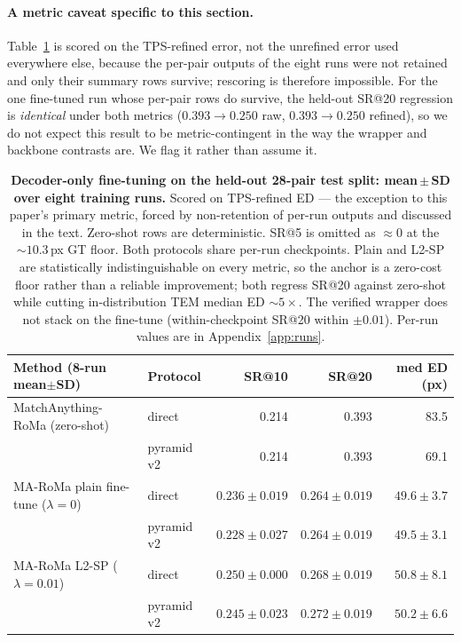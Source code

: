 \documentclass[10pt]{article}
\begin{document}
\paragraph{A metric caveat specific to this section.} Table~\ref{tab:finetune} is scored on the TPS-refined error, not the unrefined error used everywhere else, because the per-pair outputs of the eight runs were not retained and only their summary rows survive; rescoring is therefore impossible. For the one fine-tuned run whose per-pair rows do survive, the held-out SR@20 regression is \emph{identical} under both metrics ($0.393\rightarrow0.250$ raw, $0.393\rightarrow0.250$ refined), so we do not expect this result to be metric-contingent in the way the wrapper and backbone contrasts are. We flag it rather than assume it.

\begin{table}[t]
\centering
\small
\begin{tabular}{llrrr}
\toprule
Method (8-run mean$\pm$SD) & Protocol & SR@10 & SR@20 & med ED (px) \\
\midrule
MatchAnything-RoMa (zero-shot)          & direct     & 0.214 & 0.393 & 83.5 \\
                                        & pyramid v2 & 0.214 & 0.393 & 69.1 \\
\midrule
MA-RoMa plain fine-tune ($\lambda{=}0$) & direct     & $0.236\pm0.019$ & $0.264\pm0.019$ & $49.6\pm3.7$ \\
                                        & pyramid v2 & $0.228\pm0.027$ & $0.264\pm0.019$ & $49.5\pm3.1$ \\
\midrule
MA-RoMa L2-SP ($\lambda{=}0.01$)        & direct     & $0.250\pm0.000$ & $0.268\pm0.019$ & $50.8\pm8.1$ \\
                                        & pyramid v2 & $0.245\pm0.023$ & $0.272\pm0.019$ & $50.2\pm6.6$ \\
\bottomrule
\end{tabular}
\caption{\textbf{Decoder-only fine-tuning on the held-out 28-pair test split: mean\,$\pm$\,SD over eight training runs.} Scored on TPS-refined ED --- the exception to this paper's primary metric, forced by non-retention of per-run outputs and discussed in the text. Zero-shot rows are deterministic. SR@5 is omitted as ${\approx}0$ at the ${\sim}10.3$\,px GT floor. Both protocols share per-run checkpoints. Plain and L2-SP are statistically indistinguishable on every metric, so the anchor is a zero-cost floor rather than a reliable improvement; both regress SR@20 against zero-shot while cutting in-distribution TEM median ED ${\sim}5\times$. The verified wrapper does not stack on the fine-tune (within-checkpoint SR@20 within $\pm0.01$). Per-run values are in Appendix~\ref{app:runs}.}
\label{tab:finetune}
\end{table}
\end{document}
